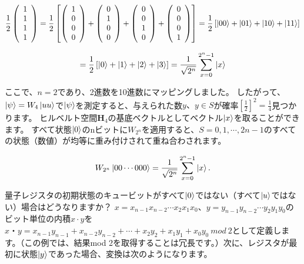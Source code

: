 \begin{equation}
\label{60}
\frac{1}{2}
\left( \begin{array}{c}
1  \\
1 \\
1 \\
1
\end{array} \right)
=
\frac{1}{2}
\left[
\left( \begin{array}{c}
1  \\
0 \\
0 \\
0
\end{array} \right)
+
\left( \begin{array}{c}
0 \\
1 \\
0 \\
0
\end{array} \right)
+
\left( \begin{array}{c}
0  \\
0 \\
1 \\
0
\end{array} \right)
+
\left( \begin{array}{c}
0  \\
0 \\
0 \\
1
\end{array} \right)
\right]
=
\frac{1}{2}\left[
\ket{00} + \ket{01}+\ket{10}+\ket{11}
\right]
\end{equation}

\begin{equation}
\label{61}
=
\frac{1}{2}
\left[
\ket{0} + \ket{1}+\ket{2}+\ket{3}
\right]
=
\frac{1}{\sqrt{2^n}}
\sum_{x=0}^{2^n-1} \ket{x}
\end{equation}

ここで、$n = 2$であり、2進数を10進数にマッピングしました。 したがって、
$\ket{\psi} = W_4 \ket{uu}$で$\ket{\psi} $を測定すると、与えられた数$y、y \in S$が確率$ \left[ \frac{1}{2} \right]^2 = \frac{1}{4}$見つかります。
ヒルベルト空間$\mathbf{H}_4$の基底ベクトルとしてベクトル$\ket{x}$を取ることができます。 
すべて状態$\ket{0}$のnビットに$W_{2^n}$を適用すると、$S = {0,1, \cdots ,2n -1}$のすべての状態（数値）が均等に重み付けされて重ね合わされます。

\begin{equation}
\label{62}
W_{2^n}
\ket{00 \cdots 000}
=
\frac{1}{\sqrt{2^n}}
\sum_{x=0}^{2^n-1} \ket{x}.
\end{equation}

量子レジスタの初期状態のキュービットがすべて$\ket{0}$ではない（すべて$\ket{u}$ではない）場合はどうなりますか？ $x = x_{n−1} x_{n−2} \cdots x_2 x_1 x_0$、$y = y_{n−1} y_{n−2} \cdots y_2 y_1 y_0$のビット単位の内積$x \cdot y$を $x・y = x_{n−1} y_{n−1} + x_{n−2} y_{n−2} + \cdots + x_2 y_2 + x_1 y_1 + x_0 y_0 \ mod \ 2 $として定義します。（この例では、結果mod 2を取得することは冗長です。）次に、レジスタが最初に状態$\ket{y}$であった場合、変換は次のようになります。

